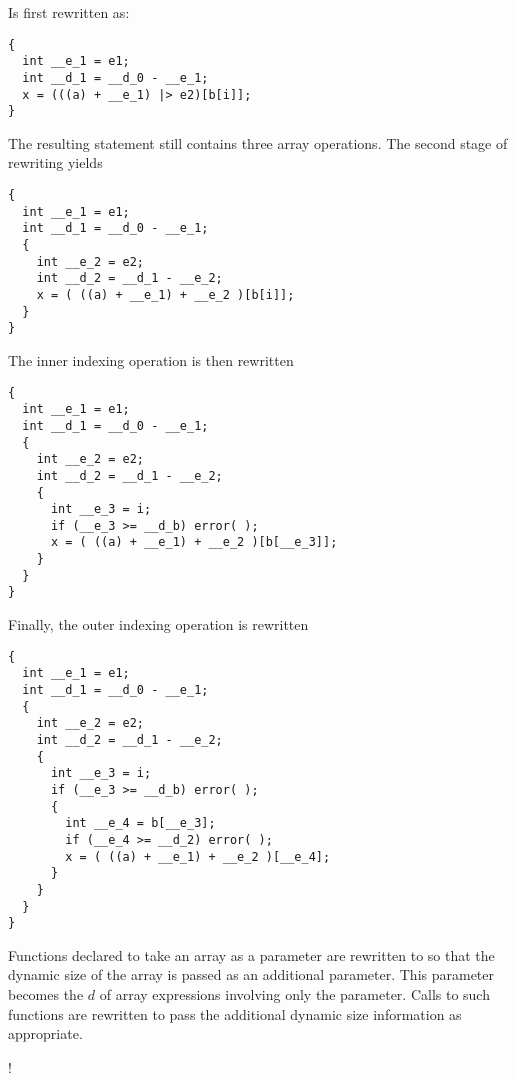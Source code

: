 Is first rewritten as:

\singlespace
\begin{lstlisting}[language=nesC]
{
  int __e_1 = e1;
  int __d_1 = __d_0 - __e_1;
  x = (((a) + __e_1) |> e2)[b[i]];
}
\end{lstlisting}
\primaryspacing

The resulting statement still contains three array operations. The second stage of rewriting
yields

\singlespace
\begin{lstlisting}[language=nesC]
{
  int __e_1 = e1;
  int __d_1 = __d_0 - __e_1;
  {
    int __e_2 = e2;
    int __d_2 = __d_1 - __e_2;
    x = ( ((a) + __e_1) + __e_2 )[b[i]];
  }
}
\end{lstlisting}
\primaryspacing

The inner indexing operation is then rewritten

\singlespace
\begin{lstlisting}[language=nesC]
{
  int __e_1 = e1;
  int __d_1 = __d_0 - __e_1;
  {
    int __e_2 = e2;
    int __d_2 = __d_1 - __e_2;
    {
      int __e_3 = i;
      if (__e_3 >= __d_b) error( );
      x = ( ((a) + __e_1) + __e_2 )[b[__e_3]];
    }
  }
}
\end{lstlisting}
\primaryspacing

Finally, the outer indexing operation is rewritten

\singlespace
\begin{lstlisting}[language=nesC]
{
  int __e_1 = e1;
  int __d_1 = __d_0 - __e_1;
  {
    int __e_2 = e2;
    int __d_2 = __d_1 - __e_2;
    {
      int __e_3 = i;
      if (__e_3 >= __d_b) error( );
      {
        int __e_4 = b[__e_3];
        if (__e_4 >= __d_2) error( );
        x = ( ((a) + __e_1) + __e_2 )[__e_4];
      }
    }
  }
}
\end{lstlisting}
\primaryspacing


Functions declared to take an array as a parameter are rewritten to so that the dynamic size of
the array is passed as an additional parameter. This parameter becomes the $d$ of array
expressions involving only the parameter. Calls to such functions are rewritten to pass the
additional dynamic size information as appropriate.


\lstDeleteShortInline!

